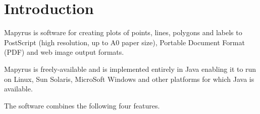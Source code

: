 
\section{Introduction}

Mapyrus is software for
creating plots of points, lines, polygons and labels 
to PostScript (high resolution, up to A0 paper size),
Portable Document Format (PDF) and web image output formats.

Mapyrus is freely-available and is implemented entirely in Java
enabling it to run on Linux, Sun Solaris, MicroSoft Windows
and other platforms for which Java is available.

The software combines the following four features.

